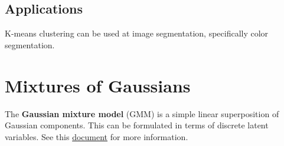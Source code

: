 \documentclass{article}
\begin{document}
    \subsection{Applications}
        K-means clustering can be used at image segmentation, specifically color segmentation.
\section{Mixtures of Gaussians}
    The \textbf{Gaussian mixture model} (GMM) is a simple linear superposition of Gaussian components. This can be formulated in
    terms of discrete latent variables. See this \href{run:../../03_bayesian_ml/models/gmm/gmm.pdf}{document} for more information.
\end{document}
